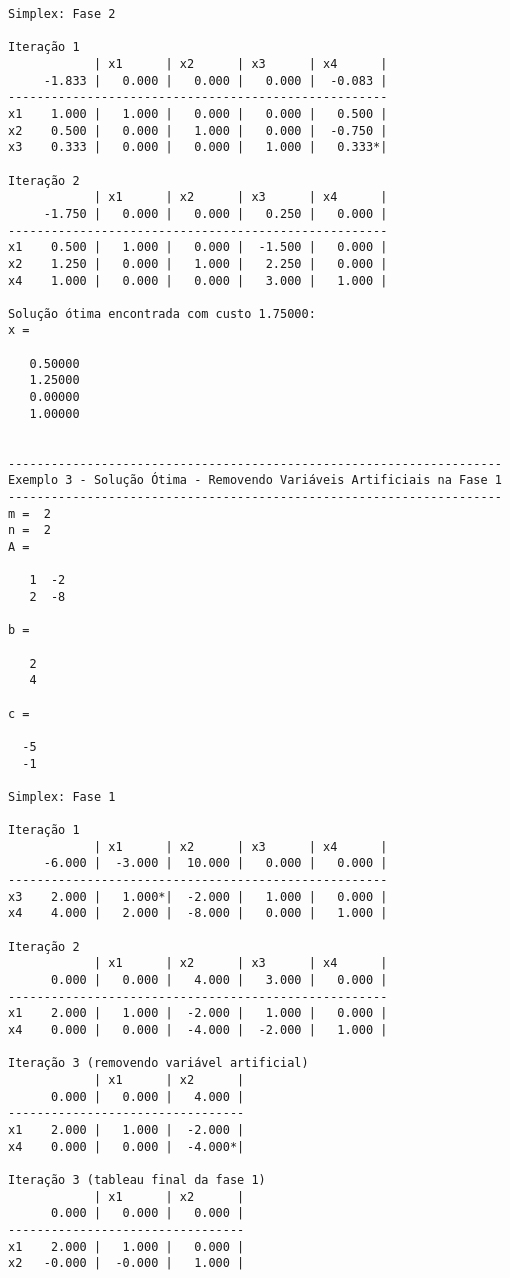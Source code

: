 \documentclass[12pt,a4paper]{article}
\begin{document}
\begin{tiny}
\begin{verbatim}
Simplex: Fase 2

Iteração 1
            | x1      | x2      | x3      | x4      |
     -1.833 |   0.000 |   0.000 |   0.000 |  -0.083 |
-----------------------------------------------------
x1    1.000 |   1.000 |   0.000 |   0.000 |   0.500 |
x2    0.500 |   0.000 |   1.000 |   0.000 |  -0.750 |
x3    0.333 |   0.000 |   0.000 |   1.000 |   0.333*|

Iteração 2
            | x1      | x2      | x3      | x4      |
     -1.750 |   0.000 |   0.000 |   0.250 |   0.000 |
-----------------------------------------------------
x1    0.500 |   1.000 |   0.000 |  -1.500 |   0.000 |
x2    1.250 |   0.000 |   1.000 |   2.250 |   0.000 |
x4    1.000 |   0.000 |   0.000 |   3.000 |   1.000 |

Solução ótima encontrada com custo 1.75000:
x =

   0.50000
   1.25000
   0.00000
   1.00000


---------------------------------------------------------------------
Exemplo 3 - Solução Ótima - Removendo Variáveis Artificiais na Fase 1
---------------------------------------------------------------------
m =  2
n =  2
A =

   1  -2
   2  -8

b =

   2
   4

c =

  -5
  -1

Simplex: Fase 1

Iteração 1
            | x1      | x2      | x3      | x4      |
     -6.000 |  -3.000 |  10.000 |   0.000 |   0.000 |
-----------------------------------------------------
x3    2.000 |   1.000*|  -2.000 |   1.000 |   0.000 |
x4    4.000 |   2.000 |  -8.000 |   0.000 |   1.000 |

Iteração 2
            | x1      | x2      | x3      | x4      |
      0.000 |   0.000 |   4.000 |   3.000 |   0.000 |
-----------------------------------------------------
x1    2.000 |   1.000 |  -2.000 |   1.000 |   0.000 |
x4    0.000 |   0.000 |  -4.000 |  -2.000 |   1.000 |

Iteração 3 (removendo variável artificial)
            | x1      | x2      |
      0.000 |   0.000 |   4.000 |
---------------------------------
x1    2.000 |   1.000 |  -2.000 |
x4    0.000 |   0.000 |  -4.000*|

Iteração 3 (tableau final da fase 1)
            | x1      | x2      |
      0.000 |   0.000 |   0.000 |
---------------------------------
x1    2.000 |   1.000 |   0.000 |
x2   -0.000 |  -0.000 |   1.000 |


\end{verbatim}
\end{tiny}
\end{document}
